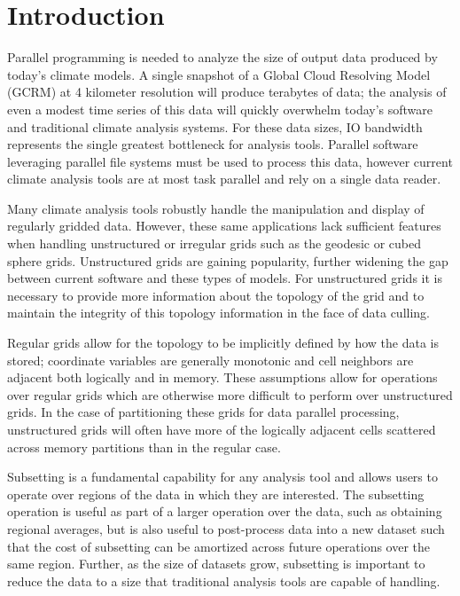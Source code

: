 \section{Introduction}
\label{section:introduction}

Parallel programming is needed to analyze the size of output data produced by
today's climate models\cite{MODSIM07:LOT,WASHINGTON08}.  A single snapshot of
a Global Cloud Resolving Model (GCRM) at 4 kilometer resolution will produce
terabytes of data\cite{GCRM}; the analysis of even a modest time series of
this data will quickly overwhelm today's software and traditional climate
analysis systems.  For these data sizes, IO bandwidth represents the single
greatest bottleneck for analysis tools.  Parallel software leveraging parallel
file systems must be used to process this data, however current climate
analysis tools are at most task parallel and rely on a single data
reader\cite{CDAT,CDO,NCO}.

Many climate analysis tools robustly handle the manipulation and display of
regularly gridded data.  However, these same applications lack sufficient
features when handling unstructured or irregular grids such as the
geodesic\cite{GEODESIC} or cubed sphere\cite{CUBE} grids.  Unstructured grids
are gaining popularity, further widening the gap between current software and
these types of models.  For unstructured grids it is necessary to provide more
information about the topology of the grid and to maintain the integrity of this
topology information in the face of data culling.

Regular grids allow for the topology to be implicitly defined by how
the data is stored; coordinate variables are generally monotonic and cell
neighbors are adjacent both logically and in memory.  These assumptions allow
for operations over regular grids which are otherwise more difficult to
perform over unstructured grids.  In the case of partitioning these grids for
data parallel processing, unstructured grids will often have more of the
logically adjacent cells scattered across memory partitions than in the
regular case.

Subsetting is a fundamental capability for any analysis tool and allows users
to operate over regions of the data in which they are interested.  The
subsetting operation is useful as part of a larger operation over the data,
such as obtaining regional averages, but is also useful to post-process data
into a new dataset such that the cost of subsetting can be amortized across
future operations over the same region.  Further, as the size of datasets
grow, subsetting is important to reduce the data to a size that traditional
analysis tools are capable of handling. 

